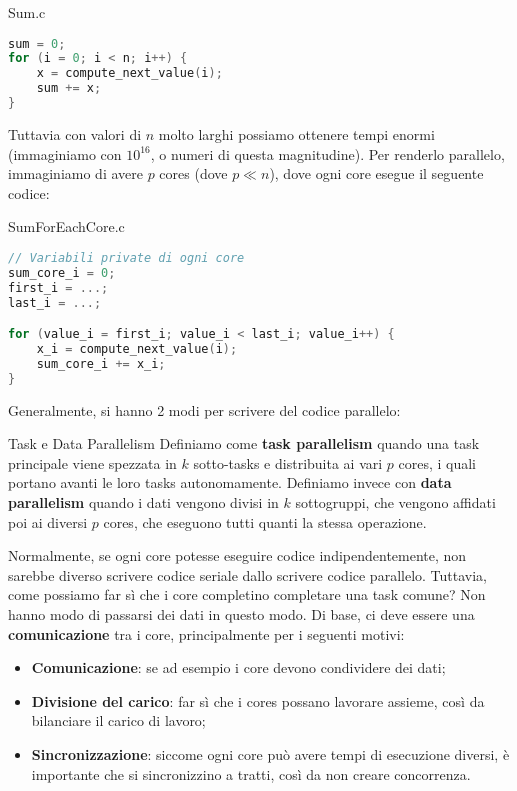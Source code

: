 \begin{codeblock}{Sum.c}
    \begin{lstlisting}[language = c]
sum = 0;
for (i = 0; i < n; i++) {
	x = compute_next_value(i);
	sum += x;
}   \end{lstlisting}
\end{codeblock}

Tuttavia con valori di $n$ molto larghi possiamo ottenere tempi enormi (immaginiamo con $10^{16}$, o numeri di questa magnitudine). Per renderlo parallelo, immaginiamo di avere $p$ cores (dove $p \ll n$), dove ogni core esegue il seguente codice:

\begin{codeblock}{SumForEachCore.c}
    \begin{lstlisting}[language = c]
// Variabili private di ogni core
sum_core_i = 0;
first_i = ...;
last_i = ...;

for (value_i = first_i; value_i < last_i; value_i++) {
	x_i = compute_next_value(i);
	sum_core_i += x_i;
}   \end{lstlisting}
\end{codeblock}

Generalmente, si hanno 2 modi per scrivere del codice parallelo:

\begin{definition}{Task e Data Parallelism}
    Definiamo come \textbf{task parallelism} quando una task principale viene spezzata in $k$ sotto-tasks e distribuita ai vari $p$ cores, i quali portano avanti le loro tasks autonomamente.
    \nl
    Definiamo invece con \textbf{data parallelism} quando i dati vengono divisi in $k$ sottogruppi, che vengono affidati poi ai diversi $p$ cores, che eseguono tutti quanti la stessa operazione.
\end{definition}

Normalmente, se ogni core potesse eseguire codice indipendentemente, non sarebbe diverso scrivere codice seriale dallo scrivere codice parallelo. Tuttavia, come possiamo far sì che i core completino completare una task comune? Non hanno modo di passarsi dei dati in questo modo. Di base, ci deve essere una \textbf{comunicazione} tra i core, principalmente per i seguenti motivi:
\begin{itemize}
    \item \textbf{Comunicazione}: se ad esempio i core devono condividere dei dati;
    \item \textbf{Divisione del carico}: far sì che i cores possano lavorare assieme, così da bilanciare il carico di lavoro;
    \item \textbf{Sincronizzazione}: siccome ogni core può avere tempi di esecuzione diversi, è importante che si sincronizzino a tratti, così da non creare concorrenza.
\end{itemize}

